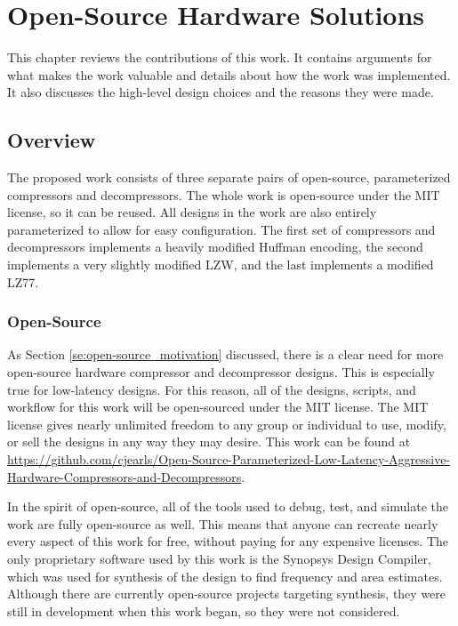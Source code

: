 \documentclass[doublespace,nopageskip]{VTthesis}
\begin{document}
\chapter{Open-Source Hardware Solutions} \label{ch:open-source_hardware_solutions}
This chapter reviews the contributions of this work. It contains arguments for what makes the work valuable and details about how the work was implemented. It also discusses the high-level design choices and the reasons they were made.

\section{Overview}\label{se:overview}
The proposed work consists of three separate pairs of open-source, parameterized compressors and decompressors. The whole work is open-source under the MIT license, so it can be reused. All designs in the work are also entirely parameterized to allow for easy configuration. The first set of compressors and decompressors implements a heavily modified Huffman encoding, the second implements a very slightly modified LZW, and the last implements a modified LZ77.

\subsection{Open-Source}\label{ss:open-source}
As Section \ref{se:open-source_motivation} discussed, there is a clear need for more open-source hardware compressor and decompressor designs. This is especially true for low-latency designs. For this reason, all of the designs, scripts, and workflow for this work will be open-sourced under the MIT license. The MIT license gives nearly unlimited freedom to any group or individual to use, modify, or sell the designs in any way they may desire. This work can be found at \href{https://github.com/cjearls/Open-Source-Parameterized-Low-Latency-Aggressive-Hardware-Compressors-and-Decompressors}{https://github.com/cjearls/Open-Source-Parameterized-Low-Latency-Aggressive-Hardware-Compressors-and-Decompressors}.

In the spirit of open-source, all of the tools used to debug, test, and simulate the work are fully open-source as well. This means that anyone can recreate nearly every aspect of this work for free, without paying for any expensive licenses. The only proprietary software used by this work is the Synopsys Design Compiler, which was used for synthesis of the design to find frequency and area estimates. Although there are currently open-source projects targeting synthesis, they were still in development when this work began, so they were not considered.
\end{document}
